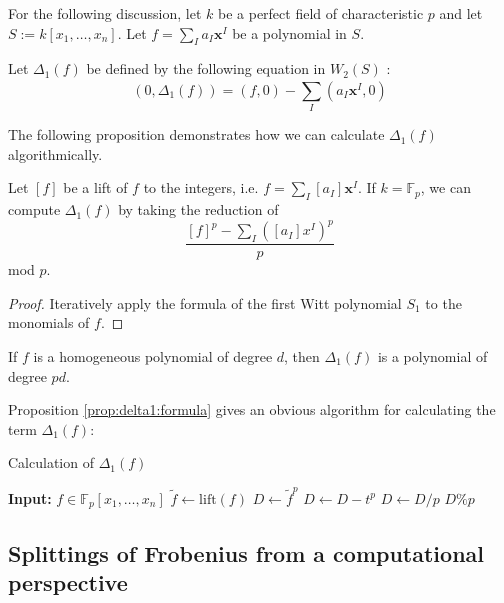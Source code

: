For the following discussion, 
let \(k\) be a perfect field of characteristic \(p\) and 
let \(S := k[x_{1}, \ldots, x_{n}]\).
Let \(f = \sum_{I}^{} a_{I}\mathbf{x}^{I}\) be a polynomial in \(S\).

\begin{defn}
	Let \(\Delta_{1}(f)\)
	be defined by the following equation in \(W_{2}(S)\) :
	\[
		(0, \Delta_{1}(f)) = (f,0) - \sum_{I}^{} (a_{I}\mathbf{x}^{I}, 0) 
	\] 
\end{defn}

The following proposition demonstrates how we can calculate 
\(\Delta_{1}(f)\) algorithmically.

\begin{prop}
	\label{prop:delta1:formula}
	Let \([f]\) be a lift of \(f\) to the integers,
	i.e.
	\(f = \sum_{I}^{} [a_{I}] \mathbf{x}^{I}\).
	If \(k = \mathbb{F}_{p}\),
	we can compute \(\Delta_{1}(f)\) by 
	taking the reduction of
	\[
		\frac{[f]^{p} - \sum_{I}^{} ([a_{I}]x^{I})^{p} }{p}
	\] 
	mod \(p\).
\end{prop}

\begin{proof}
	Iteratively apply the formula of the first
	Witt polynomial \(S_{1}\) 
	to the monomials of \(f\).
\end{proof}

\begin{rmk}
	If \(f\) is a homogeneous polynomial of degree \(d\), 
	then \(\Delta_{1}(f)\) is a polynomial of degree \(pd\).
\end{rmk}

Proposition \ref{prop:delta1:formula} gives an obvious algorithm
for calculating the term \(\Delta_{1}(f)\): 

\begin{algorithm}
\caption{Calculation of \(\Delta_{1}(f)\) }
	\label{alg:calc:delta1}
    \begin{algorithmic}[1]
		\State \textbf{Input:} \(f \in \mathbb{F}_{p}[x_{1}, \ldots, x_{n}]\) 
		\State \(\tilde{f} \gets \text{lift}(f)\) 
		\State \(D \gets \tilde{f}^{p}\) 
		    \State \(D \gets D - t^{p}\) 
		\EndFor
		\State \(D \gets D / p\)
		\State \Return \(D \% p\) 
	\end{algorithmic}
\end{algorithm}

\subsection{Splittings of Frobenius from a computational perspective}

